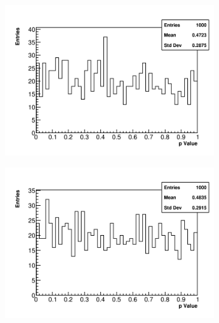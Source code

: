\begin{figure}[]
\centering
    \begin{subfigure}[t]{0.45\textwidth}
        \centering
        \includegraphics[width=\textwidth]{PValues_TMethod}
        \caption{}
    \end{subfigure}
    \hspace{1mm}
    \begin{subfigure}[t]{0.45\textwidth}
        \centering
        \includegraphics[width=\textwidth]{PValues_AMethod}
        \caption{}
    \end{subfigure}%


\end{figure}
